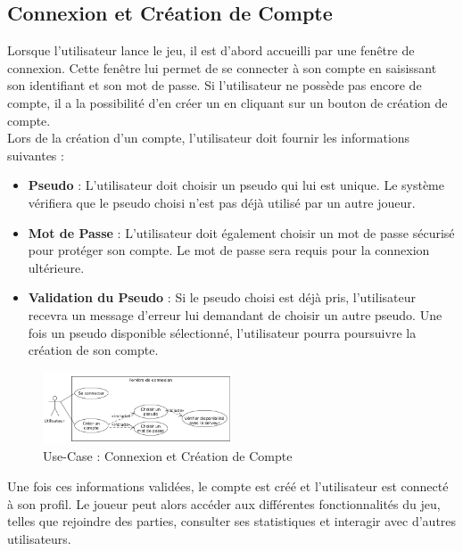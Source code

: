 \documentclass{report}
\begin{document}
\subsection{Connexion et Création de Compte}

\noindent Lorsque l’utilisateur lance le jeu, il est d'abord accueilli par une fenêtre de connexion. Cette fenêtre lui permet de se connecter à son compte en saisissant son identifiant et son mot de passe. Si l'utilisateur ne possède pas encore de compte, il a la possibilité d'en créer un en cliquant sur un bouton de création de compte. \\

\noindent Lors de la création d'un compte, l'utilisateur doit fournir les informations suivantes :
\begin{itemize}
    \item \textbf{Pseudo} : L'utilisateur doit choisir un pseudo qui lui est unique. Le système vérifiera que le pseudo choisi n'est pas déjà utilisé par un autre joueur.
    \item \textbf{Mot de Passe} : L'utilisateur doit également choisir un mot de passe sécurisé pour protéger son compte. Le mot de passe sera requis pour la connexion ultérieure.
    \item \textbf{Validation du Pseudo} : Si le pseudo choisi est déjà pris, l'utilisateur recevra un message d'erreur lui demandant de choisir un autre pseudo. Une fois un pseudo disponible sélectionné, l'utilisateur pourra poursuivre la création de son compte. \\
\end{itemize}

\vspace{-2em}

\begin{figure}[H]
    \centering
     \includegraphics[width=0.5\textwidth, keepaspectratio]{src/user_req/connexion.png}
    \caption{Use-Case : Connexion et Création de Compte}
    \label{fig:use_case_connexion}
\end{figure}

\noindent Une fois ces informations validées, le compte est créé et l'utilisateur est connecté à son profil. Le joueur peut alors accéder aux différentes fonctionnalités du jeu, telles que rejoindre des parties, consulter ses statistiques et interagir avec d'autres utilisateurs.
\end{document}
